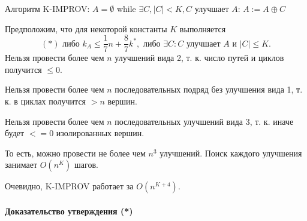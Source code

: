 Алгоритм K-IMPROV:
$A = \emptyset$
while $\exists C, |C|<K, C$ улучшает $A$:
$A := A \oplus C$

Предположим, что для некоторой константы $K$ выполняется 
$$(*) \text{ либо } k_A \le \frac{1}{7}n+\frac{8}{7}k^*, \text{ либо } \exists C: C \text{ улучшает } A \textbf{ и } |C|\le K.$$
Нельзя провести более чем $n$ улучшений вида 2, т. к. число путей и циклов получится $\le0$.

Нельзя провести более чем $n$ последовательных подряд без улучшения вида 1, т. к. в циклах получится $>n$ вершин.

Нельзя провести более чем $n$ последовательных улучшений вида 3, т. к. иначе будет $<= 0$ изолированных вершин. 

То есть, можно провести не более чем $n^3$ улучшений. Поиск каждого улучшения занимает $O(n^K)$ шагов.

Очевидно, K-IMPROV работает за $O(n^{K+4})$. 

\paragraph{Доказательство утверждения (*)}\cite{Korn}



